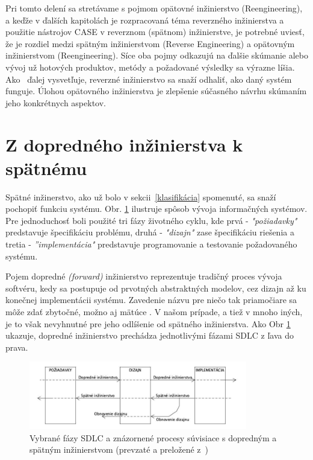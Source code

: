 \documentclass[10pt,twoside,slovak,a4paper]{article}
\begin{document}
Pri tomto delení sa stretávame s pojmom opätovné inžinierstvo (Reengineering), a keďže v ďalších kapitolách je rozpracovaná téma reverzného inžinierstva a použitie nástrojov CASE v reverznom (spätnom) inžinierstve, je potrebné uviesť, že je rozdiel medzi spätným inžinierstvom (Reverse Engineering) a opätovným inžinierstvom (Reengineering). Síce oba pojmy odkazujú na ďalšie skúmanie alebo vývoj už hotových produktov, metódy a požadované výsledky sa výrazne líšia.  Ako~\cite{reengineering} ďalej vysvetľuje, reverzné inžinierstvo sa snaží odhaliť, ako daný systém funguje. Úlohou opätovného inžinierstva je zlepšenie súčasného návrhu skúmaním jeho konkrétnych aspektov. 


\section{Z dopredného inžinierstva k spätnému}\label{forward vs reverse}


Spätné inžinerstvo, ako už bolo v sekcii~\ref{klasifikácia} spomenuté, sa snaží pochopiť funkciu systému. Obr. \ref{obr_forward_reverse} ilustruje spôsob vývoja informačných systémov. Pre jednoduchosť boli použité tri fázy životného cyklu, kde prvá -  \emph{"požiadavky"} predstavuje špecifikáciu problému, druhá  - \emph{"dizajn"} zase špecifikáciu riešenia a tretia -  \emph{''implementácia"} predstavuje programovanie a testovanie požadovaného systému.


Pojem dopredné \textit{(forward)} inžinierstvo reprezentuje tradičný proces vývoja softvéru, kedy sa postupuje od prvotných abstraktných modelov, cez dizajn až ku konečnej implementácii systému. Zavedenie názvu pre niečo tak priamočiare sa môže zdať zbytočné, možno aj mätúce . V našom prípade, a tiež v mnoho iných, je to však nevyhnutné pre jeho odlíšenie od spätného inžinierstva. Ako Obr \ref{obr_forward_reverse} ukazuje, dopredné inžinierstvo prechádza jednotlivými fázami SDLC z ľava do prava.
\begin{figure}[h]
\centering
\includegraphics[width=0.85\textwidth]{forward_reverse.jpg}
\caption{Vybrané fázy SDLC a znázornené procesy súvisiace s dopredným a spätným inžinierstvom (prevzaté a preložené z~\cite{2010})}
\label{obr_forward_reverse}
\end{figure}
\end{document}
